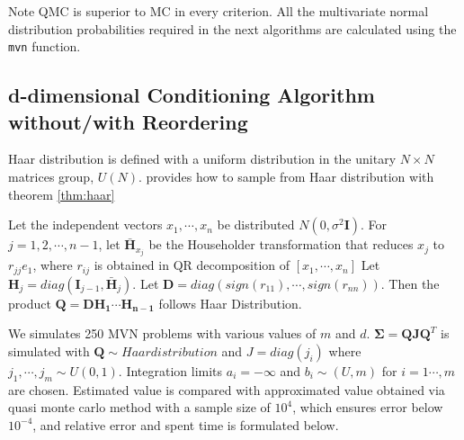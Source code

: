 Note QMC is superior to MC in every criterion. All the multivariate normal distribution probabilities required in the next algorithms are calculated using the \texttt{mvn} function.

\subsection{d-dimensional Conditioning Algorithm without/with Reordering}

Haar distribution is defined with a uniform distribution in the unitary $N\times N$ matrices group, $U(N)$.
\citet{stewart1980efficient} provides how to sample from Haar distribution with theorem \ref{thm:haar}

\begin{theorem}\label{thm:haar}\citet{stewart1980efficient}
	Let the independent vectors $x_1,\cdots,x_{n}$ be distributed $N(0,\sigma^2 \mathbf{I})$. For $j=1,2,\cdots,n-1$, let $\mathbf{\bar{H}}_{x_j}$ be the Householder transformation that reduces $x_j$ to $r_{jj}e_1$, where $r_{ij}$ is obtained in QR decomposition of $[x_1,\cdots,x_n]$ Let $\mathbf{H}_j=diag(\mathbf{I}_{j-1},\bar{\mathbf{H}}_j)$. Let $\mathbf{D}=diag(sign(r_{11}), \cdots, sign(r_{nn}))$. Then the product $\mathbf{Q}=\mathbf{DH_1\cdots H_{n-1}}$ follows Haar Distribution.
\end{theorem}

We simulates 250 MVN problems with various values of $m$ and $d$. $\mathbf{\Sigma}=\mathbf{Q}\mathbf{J}\mathbf{Q}^T$ is simulated with $\mathbf{Q}\sim{Haar distribution}$ and $J=diag(j_i)$ where $j_1,\cdots,j_m\sim U(0,1)$. Integration limits $a_i=-\infty$ and $b_i\sim(U,m)$ for $i=1\cdots,m$ are chosen. Estimated value is compared with approximated value obtained via quasi monte carlo method with a sample size of $10^4$, which ensures error below $10^{-4}$, and relative error and spent time is formulated below.

